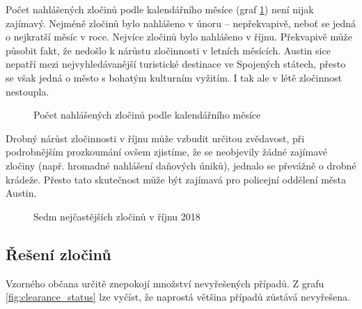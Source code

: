 \documentclass{article}
\begin{document}
Počet nahlášených zločinů podle kalendářního měsíce (graf \ref{fig:crime_per_each_month}) není
nijak zajímavý. Nejméně zločinů bylo nahlášeno v únoru -- nepřekvapivě, neboť se jedná
o nejkratší měsíc v roce. Nejvíce zločinů bylo nahlášeno v říjnu. Překvapivě může působit
fakt, že nedošlo k nárůstu zločinnosti v letních měsících. Austin sice nepatří mezi
nejvyhledávanější turistické destinace ve Spojených státech, přesto se však jedná o město
s bohatým kulturním vyžitím. I tak ale v létě zločinnost nestoupla.

\begin{figure}
  \centering
  \caption{Počet nahlášených zločinů podle kalendářního měsíce}
  \label{fig:crime_per_each_month}
\end{figure}

Drobný nárůst zločinnosti v říjnu může vzbudit určitou zvědavost, při podrobnějším prozkoumání
ovšem zjistíme, že se neobjevily žádné zajímavé zločiny (např. hromadné nahlášení daňových úniků),
jednalo se převážně o drobné krádeže. Přesto tato skutečnost může být zajímavá pro policejní
oddělení města Austin.

\begin{figure}
  \centering
  \caption{Sedm nejčastějších zločinů v říjnu 2018}
  \label{fig:october_crime}
\end{figure}

\subsection{Řešení zločinů}

Vzorného občana určitě znepokojí množství nevyřešených případů. Z grafu \ref{fig:clearance_status}
lze vyčíst, že naprostá většina případů zůstává nevyřešena.
\end{document}
